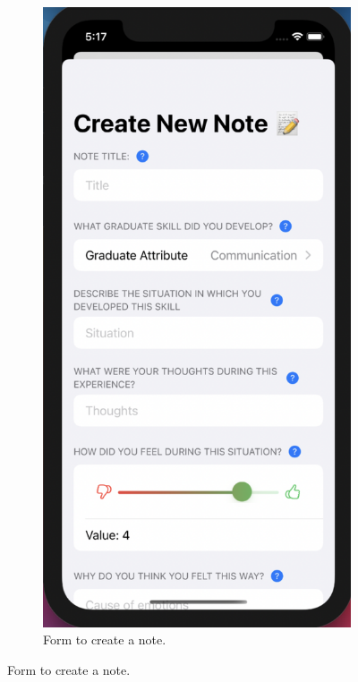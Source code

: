 \documentclass{l4proj}
\begin{document}
\begin{figure}
    \centering
    \begin{subfigure}[b]{0.3\textwidth}
        \includegraphics[scale=0.25]{images/CreatingNote.pdf}
        \caption{Form to create a note.}

\end{subfigure}
\end{figure}
\end{document}
